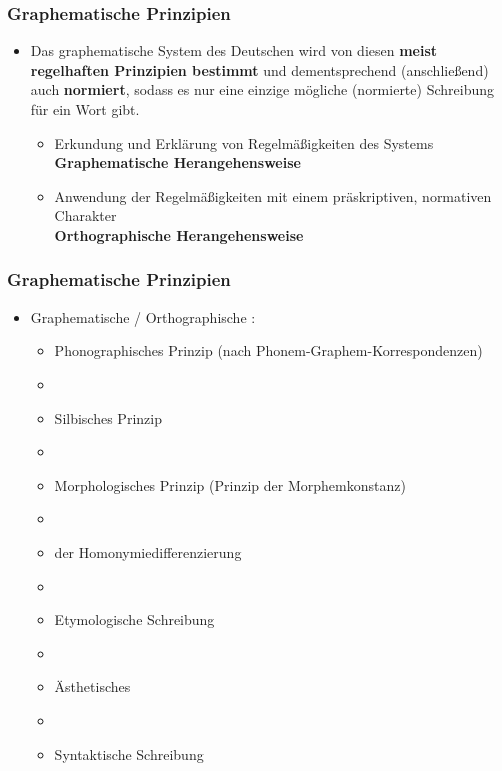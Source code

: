 \begin{frame}
\frametitle{Graphematische Prinzipien}

\begin{itemize}
	\item Das graphematische System des Deutschen wird von diesen
	\textbf{meist regelhaften Prinzipien bestimmt} und dementsprechend
	(anschließend) auch \textbf{normiert}, sodass es nur eine einzige
	mögliche (normierte) Schreibung für ein Wort gibt.
	
	\begin{itemize}
		\item Erkundung und Erklärung von Regelmäßigkeiten des Systems \\
		\ras \textbf{Graphematische Herangehensweise}
		
		\item Anwendung der Regelmäßigkeiten mit einem präskriptiven,
		normativen Charakter \\
		\ras \textbf{Orthographische Herangehensweise}
	\end{itemize}
\end{itemize}
\end{frame}


\begin{frame}
\frametitle{Graphematische Prinzipien}

\begin{itemize}
	\item Graphematische / Orthographische :
	
	\begin{itemize}
		\item Phonographisches Prinzip (nach Phonem-Graphem-Korrespondenzen)
		\item[]
		\item Silbisches Prinzip
		\item[]
		\item Morphologisches Prinzip (Prinzip der Morphemkonstanz)
		\item[]
		\item {} der Homonymiedifferenzierung
		\item[]
		\item Etymologische Schreibung
		\item[]
		\item Ästhetisches 
		\item[]
		\item Syntaktische Schreibung
	\end{itemize}
\end{itemize}


\end{frame}


